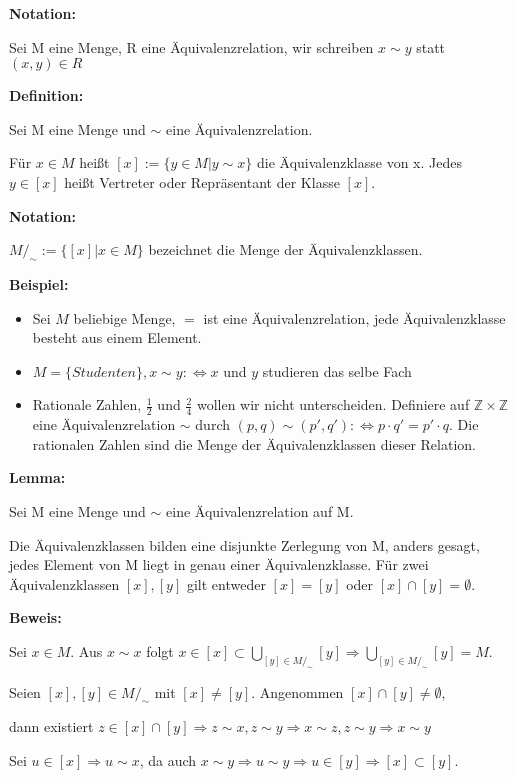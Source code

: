\documentclass[pdftex,12pt,a4paper,fleqn]{scrartcl}
\begin{document}
\textbf{Notation:}

Sei M eine Menge, R eine Äquivalenzrelation, wir schreiben $x \sim y$ statt $(x,y) \in R$

\textbf{Definition:}

Sei M eine Menge und $\sim$ eine Äquivalenzrelation.

Für $ x \in M$ heißt $[x] := \{y \in M | y \sim x\}$ die Äquivalenzklasse von x. Jedes $y \in [x]$ heißt Vertreter oder Repräsentant der Klasse $[x]$.

\textbf{Notation:}

$M /_\sim := \{[x] | x \in M \}$ bezeichnet die Menge der Äquivalenzklassen.

\textbf{Beispiel:}
\begin{itemize}
	\item Sei $M$ beliebige Menge, $=$ ist eine Äquivalenzrelation, jede Äquivalenzklasse besteht aus einem Element.
	\item $M = \{Studenten\}, x \sim y: \Leftrightarrow x$ und $y$ studieren das selbe Fach
	\item Rationale Zahlen, $\frac{1}{2}$ und $\frac{2}{4}$ wollen wir nicht unterscheiden.
	Definiere auf $\mathbb{Z} \times \mathbb{Z}$ eine Äquivalenzrelation $\sim$ durch 
	$(p,q) \sim (p',q'):\Leftrightarrow p \cdot q' = p' \cdot q$.
	Die rationalen Zahlen sind die Menge der Äquivalenzklassen dieser Relation.
\end{itemize}

\textbf{Lemma:}

Sei M eine Menge und $\sim$ eine Äquivalenzrelation auf M. 

Die Äquivalenzklassen bilden eine disjunkte Zerlegung von M, anders gesagt, jedes Element von M liegt in genau einer Äquivalenzklasse. Für zwei Äquivalenzklassen $[x],[y]$ gilt entweder $[x]=[y]$ oder $[x] \cap [y] = \emptyset$.

\textbf{Beweis:}

Sei $x \in M$. Aus $x \sim x$ folgt $x \in [x] \subset \bigcup_{[y] \in M/_\sim}[y] \Rightarrow \bigcup_{[y] \in M/_\sim}[y] = M$.

Seien $[x],[y] \in M/_\sim $ mit $[x]\neq[y] $. Angenommen $[x] \cap [y] \neq \emptyset$, 

dann existiert $z \in [x]\cap[y] \Rightarrow z \sim x, z \sim y \Rightarrow x \sim z, z \sim y \Rightarrow x \sim y$

Sei $u \in [x] \Rightarrow u \sim x$, da auch $x \sim y \Rightarrow u \sim y \Rightarrow u \in [y] \Rightarrow [x] \subset [y]$.
\end{document}
